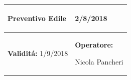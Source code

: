 \documentclass[a4paper]{article}
\begin{document}
                          \begin{center}
                          \begin{tabular}{|L{89mm} R{60mm}| }
                          \hline
                          \vspace{2.5mm}
                          \begin{spacing}{0}
                            \textbf{Preventivo Edile}
                          \end{spacing}&
                          \vspace{2.5mm}
                          \begin{spacing}{0}
        
                     2/8/2018

                          \end{spacing}\\
                          \hline
                          \vspace{2.5mm}
                          \begin{spacing}{0}
                            \textbf{Validit\'a:}
                       1/9/2018
                          \end{spacing} &
                          \vspace{2.5mm}
                          \begin{spacing}{0}
                            \textbf{Operatore:}

                       Nicola Pancheri
                          \end{spacing} \\
                          \hline
                          \end{tabular}
                          \end{center}
                        
\end{document}
